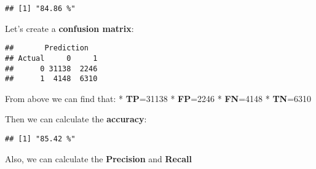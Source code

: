 \documentclass[]{article}
\newenvironment{Shaded}{\begin{snugshade}}{\end{snugshade}}
\newcommand{\KeywordTok}[1]{\textcolor[rgb]{0.13,0.29,0.53}{\textbf{#1}}}
\newcommand{\DecValTok}[1]{\textcolor[rgb]{0.00,0.00,0.81}{#1}}
\newcommand{\StringTok}[1]{\textcolor[rgb]{0.31,0.60,0.02}{#1}}
\newcommand{\CommentTok}[1]{\textcolor[rgb]{0.56,0.35,0.01}{\textit{#1}}}
\newcommand{\OperatorTok}[1]{\textcolor[rgb]{0.81,0.36,0.00}{\textbf{#1}}}
\newcommand{\NormalTok}[1]{#1}
\begin{document}
\begin{verbatim}
## [1] "84.86 %"
\end{verbatim}

Let's create a \textbf{confusion matrix}:

\begin{Shaded}
\end{Shaded}

\begin{verbatim}
##       Prediction
## Actual     0     1
##      0 31138  2246
##      1  4148  6310
\end{verbatim}

From above we can find that: * \textbf{TP}=31138 * \textbf{FP}=2246 *
\textbf{FN}=4148 * \textbf{TN}=6310

Then we can calculate the \textbf{accuracy}:

\begin{Shaded}
\end{Shaded}

\begin{verbatim}
## [1] "85.42 %"
\end{verbatim}

Also, we can calculate the \textbf{Precision} and \textbf{Recall}
\end{document}
